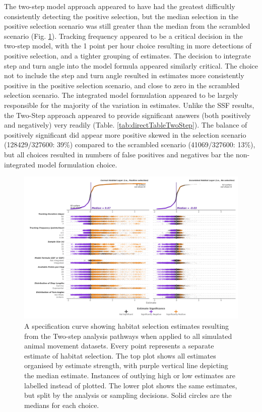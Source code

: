 \documentclass[10pt,a4paper]{article}
\begin{document}
The two-step model approach appeared to have had the greatest difficultly consistently detecting the positive selection, but the median selection in the positive selection scenario was still greater than the median from the scrambled scenario (Fig. \ref{fig:specCurveTwoStep}).
Tracking frequency appeared to be a critical decision in the two-step model, with the 1 point per hour choice resulting in more detections of positive selection, and a tighter grouping of estimates.
The decision to integrate step and turn angle into the model formula appeared similarly critical.
The choice not to include the step and turn angle resulted in estimates more consistently positive in the positive selection scenario, and close to zero in the scrambled selection scenario.
The integrated model formulation appeared to be largely responsible for the majority of the variation in estimates.
Unlike the SSF results, the Two-Step approach appeared to provide significant answers (both positively and negatively) very readily (Table. \ref{tab:directTableTwoStep}).
The balance of positively significant did appear more positive skewed in the selection scenario (128429/327600: 39\%) compared to the scrambled scenario (41069/327600: 13\%), but all choices resulted in numbers of false positives and negatives bar the non-integrated model formulation choice.

\begin{figure}
\includegraphics[width=1\linewidth]{../figures/twoStep_specCurve} \caption{A specification curve showing habitat selection estimates resulting from the Two-step analysis pathways when applied to all simulated animal movement datasets. Every point represents a separate estimate of habitat selection. The top plot shows all estimates organised by estimate strength, with purple vertical line depicting the median estimate. Instances of outlying high or low estimates are labelled instead of plotted. The lower plot shows the same estimates, but split by the analysis or sampling decisions. Solid circles are the medians for each choice.}\label{fig:specCurveTwoStep}
\end{figure}
\end{document}
